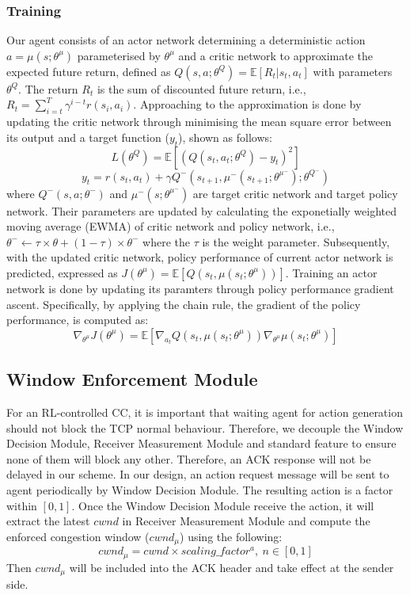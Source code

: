 \documentclass[journal]{IEEEtran}
\begin{document}
\subsubsection{Training}
Our agent consists of an actor network determining a deterministic action $a = \mu(s;\theta^{\mu})$ parameterised by $\theta^{\mu}$ and a critic network to approximate the expected future return, defined as $Q(s,a;\theta^{Q}) = \mathbb{E}[R_t|s_t,a_t]$ with parameters $\theta^{Q}$. 
The return $R_t$ is the sum of discounted future return, i.e., $R_t = \sum_{i=t}^{T}\gamma^{i-t}r(s_i,a_i)$. Approaching to the approximation is done by updating the critic network through minimising the mean square error between its output and a target function ($y_t$), shown as follows:
$$ L(\theta^Q) = \mathbb{E}[(Q(s_t,a_t;\theta^{Q}) - y_t)^2] $$
$$y_t=r(s_t,a_t) + \gamma Q^{-}(s_{t+1}, \mu^{-}(s_{t+1};\theta^{\mu^-});\theta^{Q^-})$$ 
where $Q^{-}(s, a;\theta^{-})$ and $\mu^{-}(s;\theta^{\mu^-})$ are target critic network and target policy network. Their parameters are updated by calculating the exponetially weighted moving average (EWMA) of critic network and policy network, i.e., $\theta^{-} \leftarrow \tau \times \theta + (1-\tau)\times \theta^{-}$ where the $\tau$ is the weight parameter.
Subsequently, with the updated critic network, policy performance of current actor network is predicted, expressed as $J(\theta^\mu) = \mathbb{E}[Q(s_t,\mu(s_t;\theta^\mu))]$.
Training an actor network is done by updating its paramters through policy performance gradient ascent. Specifically, by applying the chain rule, the gradient of the policy performance, is computed as:
$$\nabla_{\theta^\mu} J(\theta^\mu) = \mathbb{E}[\nabla_{a_t}Q(s_t,\mu(s_t;\theta^\mu))
\nabla_{\theta^\mu} \mu(s_t;\theta^\mu)]$$

\subsection{Window Enforcement Module}
For an RL-controlled CC, it is important that waiting agent for action generation should not block the TCP normal behaviour. Therefore, we decouple the Window Decision Module, Receiver Measurement Module and standard feature to ensure none of them will block any other. Therefore, an ACK response will not be delayed in our scheme. 
In our design, an action request message will be sent to agent periodically by Window Decision Module. The resulting action is a factor within $[0,1]$. Once the Window Decision Module receive the action, it will extract the latest $cwnd$ in Receiver Measurement Module and compute the enforced congestion window ($cwnd_{\mu}$) using the following:
\begin{equation}
cwnd_{\mu} = cwnd \times scaling\_factor ^ {a},\ n \in[0,1]
\label{eq:cwnd}
\end{equation}
Then $cwnd_{\mu}$ will be included into the ACK header and take effect at the sender side.
\end{document}
